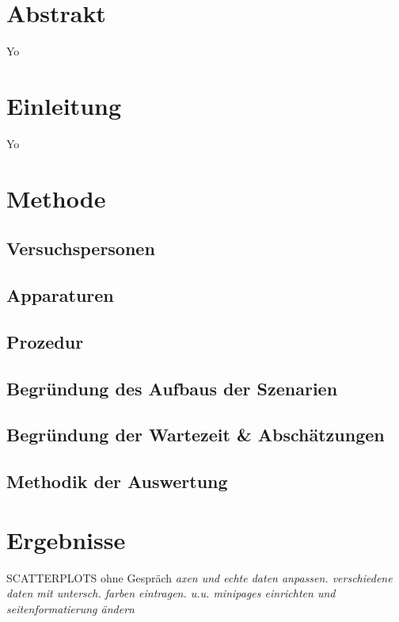 \documentclass{Paper}
\begin{document}
\maketitle


\tableofcontents
\clearpage
	
\section{Abstrakt}
	Yo
	
\section{Einleitung}
	Yo
	
\section{Methode}
	\subsection{Versuchspersonen}
	\subsection{Apparaturen}
	\subsection{Prozedur}
	\subsection{Begründung des Aufbaus der Szenarien}
	\subsection{Begründung der Wartezeit \& Abschätzungen}
	\subsection{Methodik der Auswertung}
	
\section{Ergebnisse}


	SCATTERPLOTS ohne Gespräch
	\textit{axen und echte daten anpassen. verschiedene daten mit untersch. farben eintragen. u.u. minipages einrichten und seitenformatierung ändern}
\end{document}
